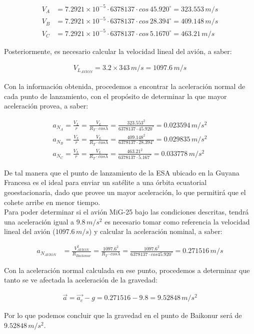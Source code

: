 \documentclass[11pt,letterpaper]{article}
\begin{document}
\begin{align}
V_{A} &= 7.2921 \times 10^{-5} \cdot 6378137 \cdot cos\,45.920 ^{\circ} = 323.553\,m/s\\
V_{B} &= 7.2921 \times 10^{-5} \cdot 6378137 \cdot cos\,28.394 ^{\circ} = 409.148\,m/s\\
V_{C} &= 7.2921 \times 10^{-5} \cdot 6378137 \cdot cos\,5.1670 ^{\circ} = 463.21\,m/s
\end{align}

Posteriormente, es necesario calcular la velocidad lineal del avión, a saber:

\begin{align}
V_{L_{AVION}} = 3.2 \times 343\,m/s = 1097.6\,m/s
\end{align}

Con la información obtenida, procedemos a encontrar la aceleración normal de cada punto de lanzamiento, con el propósito de determinar la que mayor aceleración provea, a saber:

\begin{align}
a_{N_{A}} = \frac{V_{L}}{r} = \frac{V_{L}}{R_{T} \cdot cos \lambda} = \frac{323.553^2}{6378137 \cdot 45.920^{\circ}} = 0.023594\,m/s^2\\
a_{N_{B}} = \frac{V_{L}}{r} = \frac{V_{L}}{R_{T} \cdot cos \lambda} = \frac{409.148^2}{6378137 \cdot 28.394^{\circ}} = 0.029835\,m/s^2\\
a_{N_{C}} = \frac{V_{L}}{r} = \frac{V_{L}}{R_{T} \cdot cos \lambda} = \frac{463.21^2}{6378137 \cdot 5.167^{\circ}} = 0.033778\,m/s^2
\end{align}

De tal manera que el punto de lanzamiento de la ESA ubicado en la Guyana Francesa es el ideal para enviar un satélite a una órbita ecuatorial geoestacionaria, dado que provee un mayor aceleración, lo que permitirá que el cohete arribe en menor tiempo.\\

Para poder determinar si el avión MiG-25 bajo las condiciones descritas, tendrá una aceleración igual a $9.8\,m/s^2$ es necesario tomar como referencia la velocidad lineal del avión ($1097.6\,m/s$) y calcular la aceleración nominal, a saber:

\begin{align}
a_{N_{AVION}} &= \frac{V^2_{AVION}}{R_{Baikonur}} = \frac{1097.6^2}{R_{T} \cdot cos \lambda} = \frac{1097.6^2}{6378137 \cdot cos 45.920^{\circ}} = 0.271516\,m/s
\end{align}

Con la aceleración normal calculada en ese punto, procedemos a determinar que tanto se ve afectada la aceleración de la gravedad:

\begin{align}
\vec{a} = \vec{a_{c}} - g = 0.271516 - 9.8 = 9.52848\,m/s^2
\end{align}

Por lo que podemos concluir que la gravedad en el punto de Baikonur será de $9.52848\,m/s^2$.

\end{document}
